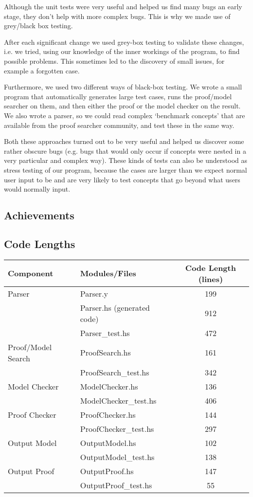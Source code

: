 Although the unit tests were very useful and helped us find many bugs an early stage, they don't help with more complex bugs. This is why we made use of grey/black box testing.

After each significant change we used grey-box testing to validate these changes, i.e. we tried, using our knowledge of the inner workings of the program, to find possible problems. This sometimes led to the discovery of small issues, for example a forgotten case.

Furthermore, we used two different ways of black-box testing. We wrote a small program that automatically generates large test cases, runs the proof/model searcher on them, and then either the proof or the model checker on the result. We also wrote a parser, so we could read complex `benchmark concepts' that are available from the proof searcher community, and test these in the same way.

Both these approaches turned out to be very useful and helped us discover some rather obscure bugs (e.g. bugs that would only occur if concepts were nested in a very particular and complex way). These kinds of tests can also be understood as stress testing of our program, because the cases are larger than we expect normal user input to be and are very likely to test concepts that go beyond what users would normally input.

\subsection{Achievements}


\subsection{Code Lengths}


\begin{center}
  \begin{tabular}{|l|l|c|}
\hline
\textbf{Component} & \textbf{Modules/Files} & \textbf{Code Length (lines)} \\
\hline
    Parser & Parser.y & 199 \\
     & Parser.hs (generated code) & 912 \\
     & Parser\_test.hs & 472 \\
\hline
    Proof/Model Search & ProofSearch.hs & 161 \\
     & ProofSearch\_test.hs & 342 \\
\hline
   Model Checker & ModelChecker.hs & 136 \\
    & ModelChecker\_test.hs & 406 \\
\hline
   Proof Checker & ProofChecker.hs & 144 \\
    & ProofChecker\_test.hs & 297 \\
\hline
   Output Model & OutputModel.hs & 102 \\
    & OutputModel\_test.hs & 138 \\
\hline
   Output Proof & OutputProof.hs & 147 \\
    & OutputProof\_test.hs & 55 \\
\hline
\end{tabular}
\end{center}
